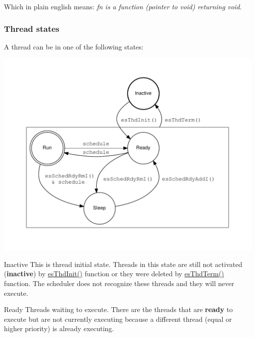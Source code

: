 Which in plain english means\-: {\itshape fn is a function (pointer to void) returning void}.\hypertarget{threads_kern_threads_state}{}\subsubsection{Thread states}\label{threads_kern_threads_state}
A thread can be in one of the following states\-: \begin{center}

\begin{DoxyImageNoCaption}
  \mbox{\includegraphics[width=\textwidth,height=\textheight/2,keepaspectratio=true]{dot_inline_dotgraph_2}}
\end{DoxyImageNoCaption}
\end{center}
 \begin{DoxyParagraph}{Inactive}
This is thread initial state. Threads in this state are still not activated ({\bfseries inactive}) by \hyperlink{group__kern__intf_gac91734f3ee867b519f59bf81cc7fde88}{es\-Thd\-Init()} function or they were deleted by \hyperlink{group__kern__intf_gac9d1eac76f26096614e8196bcfd8b905}{es\-Thd\-Term()} function. The scheduler does not recognize these threads and they will never execute.
\end{DoxyParagraph}
\begin{DoxyParagraph}{Ready}
Threads waiting to execute. There are the threads that are {\bfseries ready} to execute but are not currently executing because a different thread (equal or higher priority) is already executing.
\end{DoxyParagraph}
